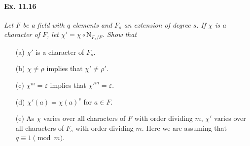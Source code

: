 \documentclass[11pt,a4paper]{article}
\begin{document}
\paragraph{Ex. 11.16}{\it Let $F$ be a field with $q$ elements and $F_s$ an extension of degree $s$. If $\chi$ is a character of $F$, let $\chi' = \chi \circ \mathrm{N}_{F_s/F}$. Show that
\begin{enumerate}
\item[(a)] $\chi'$ is a character of $F_s$.
\item[(b)] $\chi \ne \rho$ implies that $\chi' \ne \rho'$.
\item[(c)] $\chi^m = \varepsilon$ implies that $\chi'^m = \varepsilon$.
\item[(d)] $\chi'(a) = \chi(a)^s$ for $a \in F$.
\item[(e)] As $\chi$ varies over all characters of $F$ with order dividing $m$, $\chi'$ varies over all characters of $F_s$ with order dividing $m$. Here we are assuming that $q \equiv 1 \pmod m$.
\end{enumerate}
}
\end{document}
